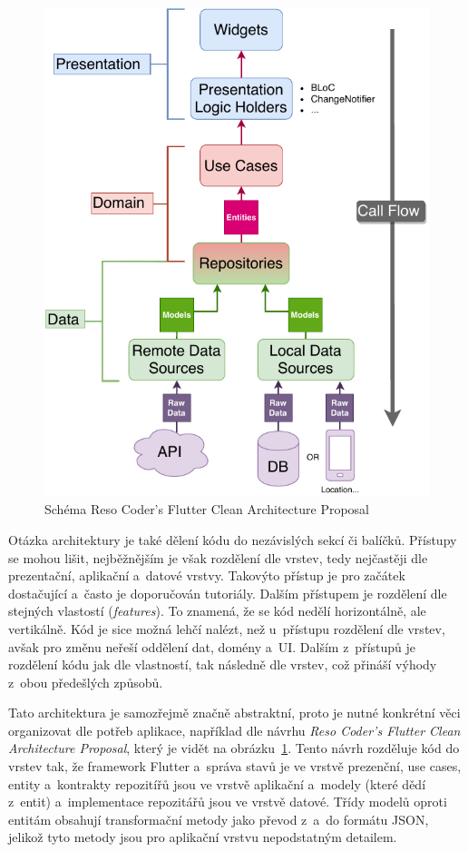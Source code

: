 \begin{figure}[t!]
    \centering
    \includegraphics[width=0.85\linewidth]{assets/technology-research/architecture/reso-coder-clean-architecture.pdf}
    \caption{Schéma Reso Coder's Flutter Clean Architecture Proposal~\cite{reso_coder_clean_architecture}}
    \label{fig:reso_coder_clean_architecture}
\end{figure}

Otázka architektury je také dělení kódu do nezávislých sekcí či balíčků.
Přístupy se mohou lišit,
nejběžnějším je však rozdělení dle vrstev,
tedy nejčastěji dle prezentační, aplikační a~datové vrstvy.
Takovýto přístup je pro začátek dostačující a~často je doporučován tutoriály.
Dalším přístupem je rozdělení dle stejných vlastostí (\emph{features}).
To znamená,
že se kód nedělí horizontálně,
ale vertikálně.
Kód je sice možná lehčí nalézt,
než u~přístupu rozdělení dle vrstev,
avšak pro změnu neřeší oddělení dat, domény a~UI.
Dalším z~přístupů je rozdělení kódu jak dle vlastností,
tak následně dle vrstev,
což přináší výhody z~obou předešlých
způsobů.~\cite[str.~303--321]{martin_clean_architecture}

Tato architektura je samozřejmě značně abstraktní,
proto je nutné konkrétní věci organizovat dle potřeb aplikace,
například dle návrhu \emph{Reso Coder's Flutter Clean Architecture Proposal},
který je vidět na obrázku~\ref{fig:reso_coder_clean_architecture}.
Tento návrh rozděluje kód do vrstev tak,
že framework Flutter a~správa stavů je ve vrstvě prezenční,
use cases, entity a~kontrakty repozitířů jsou ve vrstvě aplikační
a~modely (které dědí z~entit) a~implementace repozitářů jsou ve vrstvě datové.
Třídy modelů oproti entitám obsahují transformační metody jako
převod z~a~do formátu JSON,
jelikož tyto metody jsou pro aplikační vrstvu nepodstatným
detailem.~\cite{reso_coder_clean_architecture}

